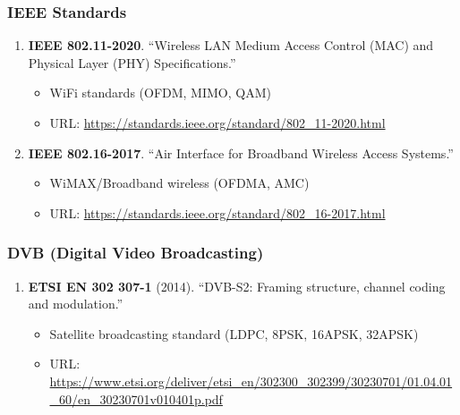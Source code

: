 \subsubsection{IEEE Standards}\label{ieee-standards}

\begin{enumerate}
\def\labelenumi{\arabic{enumi}.}
\setcounter{enumi}{30}
\tightlist
\item
  \textbf{IEEE 802.11-2020}. ``Wireless LAN Medium Access Control (MAC)
  and Physical Layer (PHY) Specifications.''

  \begin{itemize}
  \tightlist
  \item
    WiFi standards (OFDM, MIMO, QAM)
  \item
    URL: \url{https://standards.ieee.org/standard/802_11-2020.html}
  \end{itemize}
\item
  \textbf{IEEE 802.16-2017}. ``Air Interface for Broadband Wireless
  Access Systems.''

  \begin{itemize}
  \tightlist
  \item
    WiMAX/Broadband wireless (OFDMA, AMC)
  \item
    URL: \url{https://standards.ieee.org/standard/802_16-2017.html}
  \end{itemize}
\end{enumerate}

\subsubsection{DVB (Digital Video
Broadcasting)}\label{dvb-digital-video-broadcasting}

\begin{enumerate}
\def\labelenumi{\arabic{enumi}.}
\setcounter{enumi}{32}
\tightlist
\item
  \textbf{ETSI EN 302 307-1} (2014). ``DVB-S2: Framing structure,
  channel coding and modulation.''

  \begin{itemize}
  \tightlist
  \item
    Satellite broadcasting standard (LDPC, 8PSK, 16APSK, 32APSK)
  \item
    URL: \url{https://www.etsi.org/deliver/etsi_en/302300_302399/30230701/01.04.01_60/en_30230701v010401p.pdf}
  \end{itemize}
\end{enumerate}

